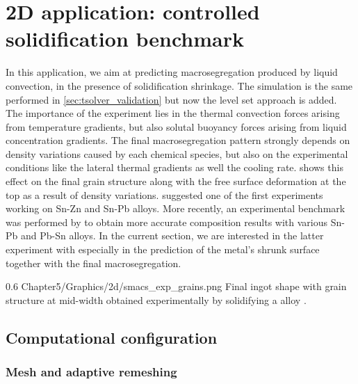 \section{2D application: controlled solidification benchmark}
In this application, we aim at predicting macrosegregation produced by liquid convection, in the presence of solidification shrinkage.
The simulation is the same performed in \cref{sec:tsolver_validation} but now the level set approach is added.
The importance of the experiment lies in the 
thermal convection forces arising from temperature gradients, but also solutal buoyancy forces arising from liquid concentration gradients. The final macrosegregation pattern
strongly depends on density variations caused by each chemical species, but also on the experimental conditions like the lateral thermal gradients as well the cooling rate.  shows this effect on the final grain structure along with the free surface deformation
at the top as a result of density variations.
\citet{hebditch_observations_1974} suggested one of the first experiments working on Sn-Zn and Sn-Pb alloys. 
More recently, an experimental benchmark was performed by \citet{hachani_experimental_2012} to obtain more accurate 
composition results with various Sn-Pb and Pb-Sn alloys. In the current section, we are interested in the latter experiment with  especially in the prediction
of the metal's shrunk surface together with the final macrosegregation.

\begin{figureth}
{0.6}
{Chapter5/Graphics/2d/smacs_exp_grains.png}
{Final ingot shape with grain structure at mid-width obtained experimentally by solidifying a  alloy \citep{carozzani_direct_2013}.}
\label{fig:smacs_exp}
\end{figureth}

\subsection{Computational configuration}

\subsubsection{Mesh and adaptive remeshing}

